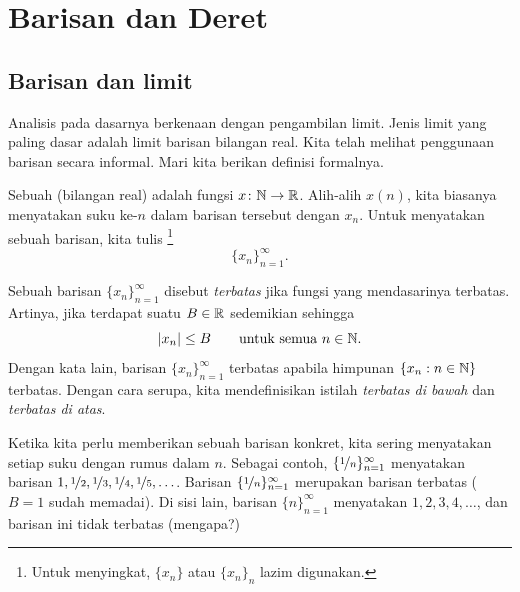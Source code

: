 \chapter{Barisan dan Deret} \label{seq:chapter}


\section{Barisan dan limit}
\label{sec:seqsandlims}



Analisis pada dasarnya berkenaan dengan pengambilan limit.  Jenis limit yang paling dasar
adalah limit barisan bilangan real.
Kita telah melihat penggunaan barisan secara informal.  Mari kita berikan
definisi formalnya.

\begin{defn}
Sebuah \emph{} (bilangan real) adalah fungsi $x \colon {\mathbb{N}} \to
{\mathbb{R}}$.  Alih-alih $x(n)$, kita
biasanya menyatakan suku ke-$n$ dalam barisan tersebut dengan $x_n$.
Untuk menyatakan sebuah barisan, kita tulis%
\footnote{Untuk menyingkat, $\{ x_n \}$ atau $\{ x_n \}_n$ lazim digunakan.}%
%
\begin{equation*}
\{ x_n \}_{n=1}^\infty.
\end{equation*}

Sebuah barisan $\{ x_n \}_{n=1}^\infty$ disebut \emph{terbatas} jika
fungsi yang mendasarinya terbatas.  Artinya, jika
terdapat suatu $B \in {\mathbb{R}}$ sedemikian sehingga
\begin{equation*}
\lvert {x_n} \rvert \leq B \qquad \text{untuk semua } n \in {\mathbb{N}}.
\end{equation*}
Dengan kata lain, barisan $\{x_n\}_{n=1}^\infty$ terbatas apabila
himpunan $\{ x_n : n \in {\mathbb{N}} \}$
terbatas.
Dengan cara serupa, kita mendefinisikan istilah
\emph{terbatas di bawah} dan
\emph{terbatas di atas}.
\end{defn}

Ketika kita perlu
memberikan sebuah barisan konkret, kita sering menyatakan setiap suku dengan rumus dalam
$n$.
Sebagai contoh, $\{ \nicefrac{1}{n} \}_{n=1}^\infty$ menyatakan
barisan $1, \nicefrac{1}{2}, \nicefrac{1}{3}, \nicefrac{1}{4},
\nicefrac{1}{5}, \ldots$.
Barisan $\{ \nicefrac{1}{n} \}_{n=1}^\infty$
merupakan barisan terbatas ($B=1$ sudah memadai).  Di sisi lain, barisan
$\{ n \}_{n=1}^\infty$ menyatakan
$1,2,3,4,\ldots$, dan barisan ini tidak terbatas (mengapa?)


